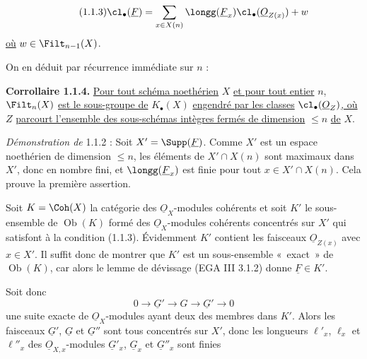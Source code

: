 
\begin{equation}\tag{1.1.3}
\cl_\bullet(\underline{F})=\sum_{x\in X(n)}\longg(\underline{F}_x)\cl_\bullet(\underline{O}_{Z(x)})+w
\end{equation}
\uline{où} $w\in\Filt_{n-1}(X)$.

On en déduit par récurrence immédiate sur $n$ :

\textbf{Corrollaire 1.1.4.} \uline{Pour tout schéma noethérien} $X$ \uline{et pour tout entier} $n$, $\Filt_n(X)$ \uline{est le sous-groupe de} $K_\bullet(X)$ \uline{engendré par les classes} $\cl_\bullet(\underline{O}_Z)$\uline{, où} $Z$ \uline{parcourt l'ensemble des sous-schémas intègres fermés de dimension} $\leq n$ \uline{de} $X$.

\emph{Démonstration de} 1.1.2 : Soit $X'=\Supp(\underline{F})$. Comme $X'$ est un espace noethérien de dimension $\leq n$, les éléments de $X'\cap X(n)$ sont maximaux dans $X'$, donc en nombre fini, et $\longg(\underline{F}_x)$ est finie pour tout $x\in X'\cap X(n)$. Cela prouve la première assertion.

Soit ${K}=\Coh(X)$ la catégorie des $\underline{O}_X$-modules cohérents et soit ${K}'$ le sous-ensemble de $\operatorname{Ob}({K})$ formé des $\underline{O}_X$-modules cohérents concentrés sur $X'$ qui satisfont à la condition (1.1.3). Évidemment ${K}'$ contient les faisceaux $\underline{O}_{Z(x)}$ avec $x\in X'$. Il suffit donc de montrer que ${K}'$ est un sous-ensemble «~exact~» de $\operatorname{Ob}({K})$, car alors le lemme de dévissage (EGA III 3.1.2) donne $\underline{F}\in{K}'$.

Soit donc
\begin{equation}\tag{1.1.5}
0\longrightarrow \underline{G}'\longrightarrow G\longrightarrow \underline{G}'\longrightarrow0
\end{equation}
une suite exacte de $\underline{O}_X$-modules ayant deux des membres dans ${K}'$. Alors les faisceaux $\underline{G}'$, $\underline{G}$ et $\underline{G}''$ sont tous concentrés sur $X'$, donc les longueurs $\ell'_x$, $\ell_x$ et $\ell''_x$ des $\underline{O}_{X,x}$-modules $\underline{G}'_x$, $\underline{G}_x$ et $\underline{G}''_x$ sont finies
